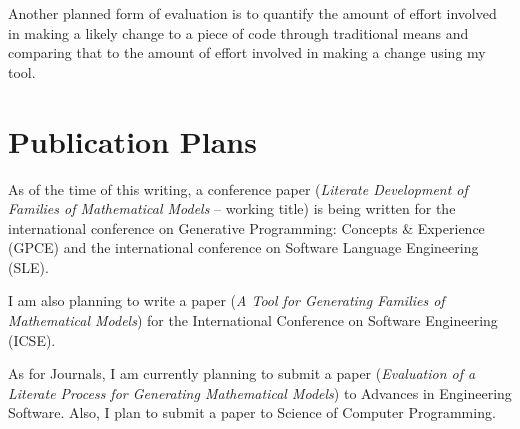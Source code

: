 \documentclass[11pt]{article} %
\begin{document}
Another planned form of evaluation is to quantify the amount of effort
involved in making a likely change to a piece of code through traditional means
and comparing that to the amount of effort involved in making a change using my
tool.

\section{Publication Plans}

As of the time of this writing, a conference paper 
(\textit{Literate Development of Families of Mathematical Models} -- working title) 
is being written for 
the international conference on Generative Programming: Concepts \& Experience
(GPCE) and the international conference on Software Language Engineering (SLE).

I am also planning to write a paper 
(\textit{A Tool for Generating Families of Mathematical Models})
for the International Conference on Software
Engineering (ICSE).

As for Journals, I am currently planning to submit a paper 
(\textit{Evaluation of a Literate Process for Generating Mathematical Models})
to Advances in Engineering Software. Also, I plan to submit a paper 
to Science of Computer Programming. 
\end{document}
